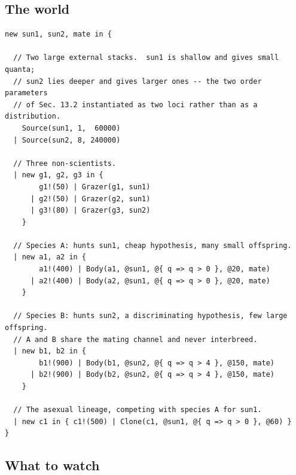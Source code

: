 \subsection{The world}\label{sci:S19.7}

\begin{lstlisting}
new sun1, sun2, mate in {

  // Two large external stacks.  sun1 is shallow and gives small quanta;
  // sun2 lies deeper and gives larger ones -- the two order parameters
  // of Sec. 13.2 instantiated as two loci rather than as a distribution.
    Source(sun1, 1,  60000)
  | Source(sun2, 8, 240000)

  // Three non-scientists.
  | new g1, g2, g3 in {
        g1!(50) | Grazer(g1, sun1)
      | g2!(50) | Grazer(g2, sun1)
      | g3!(80) | Grazer(g3, sun2)
    }

  // Species A: hunts sun1, cheap hypothesis, many small offspring.
  | new a1, a2 in {
        a1!(400) | Body(a1, @sun1, @{ q => q > 0 }, @20, mate)
      | a2!(400) | Body(a2, @sun1, @{ q => q > 0 }, @20, mate)
    }

  // Species B: hunts sun2, a discriminating hypothesis, few large offspring.
  // A and B share the mating channel and never interbreed.
  | new b1, b2 in {
        b1!(900) | Body(b1, @sun2, @{ q => q > 4 }, @150, mate)
      | b2!(900) | Body(b2, @sun2, @{ q => q > 4 }, @150, mate)
    }

  // The asexual lineage, competing with species A for sun1.
  | new c1 in { c1!(500) | Clone(c1, @sun1, @{ q => q > 0 }, @60) }
}
\end{lstlisting}

\subsection{What to watch}\label{sci:S19.8}

